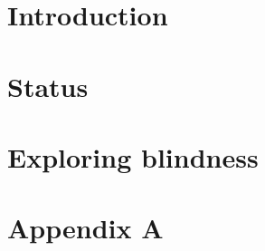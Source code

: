 \documentclass[12pt]{report}
\let\oldchapter\chapter%
\renewcommand{\chapter}{\cleardoublepage\oldchapter}%
\begin{document}
	\newpage
    

    

    {\hypersetup{linkcolor=black}
        \tableofcontents
    }
        {\hypersetup{linkcolor=mycolor}}
    
    \chapter{Introduction} 
    
    
    \chapter{Status}
    
    
    \chapter{Exploring blindness}
    
    
    \appendix
    \chapter{Appendix A}
    
\end{document}
